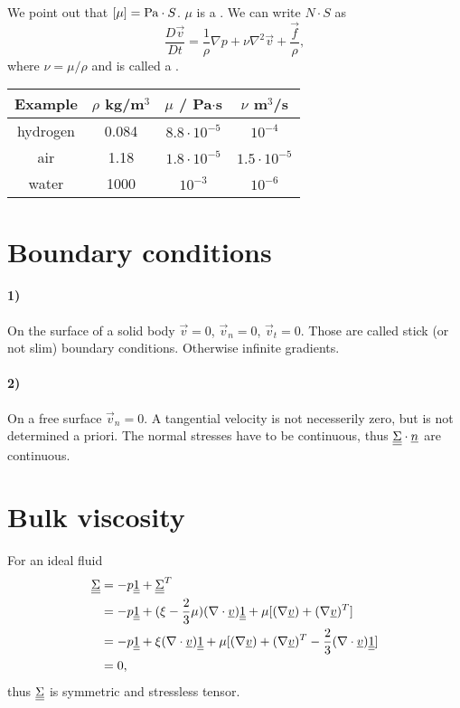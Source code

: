 \documentclass[../main.tex]{subfiles}
\begin{document}
  
  We point out that $[\mu] =\textrm{Pa} \cdot S$.
  $\mu $ is a .
  We can write $N \cdot S$ as
  \begin{displaymath}
    \frac{D \vec v}{Dt} =\frac{1}{\rho} \nabla p + \nu \nabla^2 \vec v + \frac{\vec f}{\rho},
  \end{displaymath}
  where $\nu = \mu/\rho$ and is called a .
  
    \begin{table}
      \label{tab:}
      \begin{center}
        \begin{tabular}[c]{c|c|c|c}
          \hline
          Example & $\rho$ kg/m$^3$ & $\mu$ / Pa$\cdot$s & $\nu$ m$^3$/s \\
          \hline
          hydrogen & 0.084 & $8.8\cdot 10^{-5}$ & $10^{-4}$ \\
          \hline
          air & 1.18 & $1.8\cdot 10^{-5}$ & $1.5 \cdot 10^{-5}$ \\
          \hline
          water & 1000 & $10^{-3}$ & $10^{-6}$ \\
          \hline
        \end{tabular}
      \end{center}
    \end{table}

    \section{Boundary conditions}
    \paragraph{1)}
    On the surface of a solid body $\vec v = 0$, $\vec v_n = 0$, $\vec v_t = 0$.
    Those are called stick (or not slim) boundary conditions.
    Otherwise infinite gradients.

    \paragraph{2)} On a free surface $\vec v_n = 0$. 
    A tangential velocity is not necesserily zero, but is not determined a priori.
    The normal stresses have to be continuous, thus $\underline{\underline{{\Sigma}}} \cdot \underline{n}$ are continuous.

    \section{Bulk viscosity}
    For an ideal fluid
    \begin{align*}
      \underline{\underline{{\Sigma}}} &= - p \underline{\underline{{1}}} + \underline{\underline{{\Sigma}}}^T \\
      &= - p \underline{\underline{{1}}} + (\xi - \frac{2}{3} \mu) (\nabla \cdot \underline{v}) \underline{\underline{{1}}} + \mu [(\nabla \underline{v}) + (\nabla \underline{v})^T] \\
      &= - p \underline{\underline{{1}}} + \xi (\nabla \cdot \underline{v}) \underline{\underline{{1}}} + \mu [(\nabla \underline{v}) + (\nabla \underline{v}) ^T - \frac{2}{3} (\nabla \cdot \underline{v}) \underline{\underline{{1}}}] \\
      &= 0,
    \end{align*}
    thus $\underline{\underline{{\Sigma}}}$ is symmetric and stressless tensor.
\end{document}
